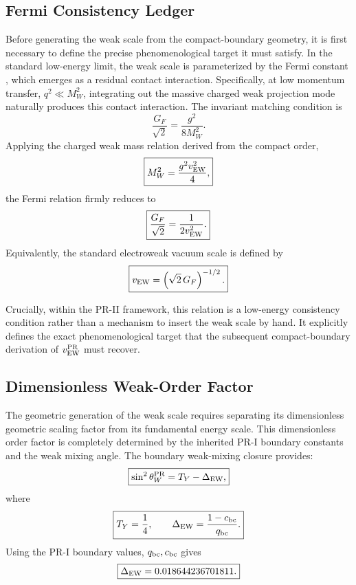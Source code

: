 \documentclass[11pt]{article}
\begin{document}
\subsection{Fermi Consistency Ledger}
\label{sec:pr2_fermi_consistency_ledger}

Before generating the weak scale from the compact-boundary geometry, it is first necessary to define the precise phenomenological target it must satisfy. In the standard low-energy limit, the weak scale is parameterized by the Fermi constant \cite{Fermi1934}, which emerges as a residual contact interaction. Specifically, at low momentum transfer,
$q^2\ll M_W^2$, integrating out the massive charged weak projection mode naturally produces this contact interaction. The invariant matching condition is
\begin{equation}
\frac{G_F}{\sqrt2}=\frac{g^2}{8M_W^2}.
\end{equation}
Applying the charged weak mass relation derived from the compact order,
\begin{equation}
\boxed{
M_W^2=\frac{g^2v_{\rm EW}^2}{4},
}
\end{equation}
the Fermi relation firmly reduces to
\begin{equation}
\boxed{
\frac{G_F}{\sqrt2}=\frac{1}{2v_{\rm EW}^2}.
}
\end{equation}
Equivalently, the standard electroweak vacuum scale is defined by
\begin{equation}
\boxed{
v_{\rm EW}
=
\left(
\sqrt{2}\,G_F
\right)^{-1/2}.
}
\end{equation}

Crucially, within the PR-II framework, this relation is a low-energy consistency condition rather than a mechanism to insert the weak scale by hand. It explicitly defines the exact phenomenological target that the subsequent compact-boundary derivation of $v_{\rm EW}^{\rm PR}$ must recover.

\subsection{Dimensionless Weak-Order Factor}
\label{sec:pr2_dimensionless_weak_order_factor}

The geometric generation of the weak scale requires separating its dimensionless geometric scaling factor from its fundamental energy scale. This dimensionless order factor is completely determined by the inherited PR-I boundary constants and the weak mixing angle. The boundary weak-mixing closure provides:
\begin{equation}
\boxed{
\sin^2\theta_W^{\rm PR}
=T_Y-\Delta_{\rm EW},
}
\end{equation}
where
\begin{equation}
\boxed{
T_Y=\frac14,
\qquad
\Delta_{\rm EW}
=
\frac{1-c_{\rm bc}}{q_{\rm bc}}.
}
\end{equation}
Using the PR-I boundary values, $q_{\rm bc},\space c_{\rm bc}$ gives
\begin{equation}
\boxed{
\Delta_{\rm EW}
=
0.018644236701811.
}
\end{equation}
\end{document}
